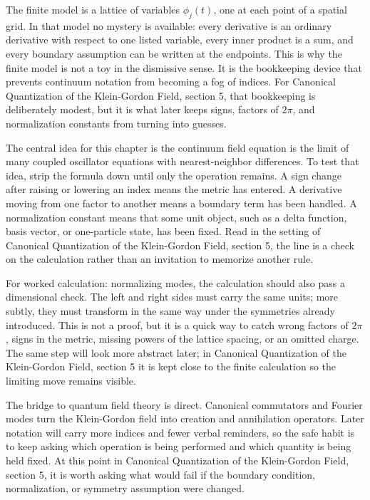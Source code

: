 The finite model is a lattice of variables \(\phi_j(t)\), one at each point of a spatial grid.  In that model no mystery is available: every derivative is an ordinary derivative with respect to one listed variable, every inner product is a sum, and every boundary assumption can be written at the endpoints.  This is why the finite model is not a toy in the dismissive sense.  It is the bookkeeping device that prevents continuum notation from becoming a fog of indices.  For Canonical Quantization of the Klein-Gordon Field, section 5, that bookkeeping is deliberately modest, but it is what later keeps signs, factors of \(2\pi\), and normalization constants from turning into guesses.

The central idea for this chapter is the continuum field equation is the limit of many coupled oscillator equations with nearest-neighbor differences.  To test that idea, strip the formula down until only the operation remains.  A sign change after raising or lowering an index means the metric has entered.  A derivative moving from one factor to another means a boundary term has been handled.  A normalization constant means that some unit object, such as a delta function, basis vector, or one-particle state, has been fixed.  Read in the setting of Canonical Quantization of the Klein-Gordon Field, section 5, the line is a check on the calculation rather than an invitation to memorize another rule.

For worked calculation: normalizing modes, the calculation should also pass a dimensional check.  The left and right sides must carry the same units; more subtly, they must transform in the same way under the symmetries already introduced.  This is not a proof, but it is a quick way to catch wrong factors of \(2\pi\), signs in the metric, missing powers of the lattice spacing, or an omitted charge.  The same step will look more abstract later; in Canonical Quantization of the Klein-Gordon Field, section 5 it is kept close to the finite calculation so the limiting move remains visible.

The bridge to quantum field theory is direct.  Canonical commutators and Fourier modes turn the Klein-Gordon field into creation and annihilation operators.  Later notation will carry more indices and fewer verbal reminders, so the safe habit is to keep asking which operation is being performed and which quantity is being held fixed.  At this point in Canonical Quantization of the Klein-Gordon Field, section 5, it is worth asking what would fail if the boundary condition, normalization, or symmetry assumption were changed.

